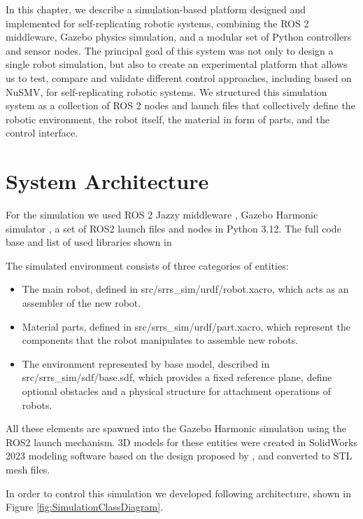 In this chapter, we describe  a simulation-based platform 
designed and implemented for self-replicating robotic systems, 
combining the ROS 2  middleware, Gazebo physics simulation, 
and a modular set of Python controllers and sensor nodes. 
The principal goal of this system was not only to design a single robot simulation, 
but also to create an experimental platform that allows us to test, 
compare and validate different control approaches, including  based  on NuSMV, 
for  self-replicating robotic systems.
We structured this simulation system as a collection of ROS 2 nodes and launch 
files that collectively define the robotic environment, the robot itself, 
the material in form of parts, and the control interface. 


\section{System Architecture}

For the simulation we used ROS 2 Jazzy middleware \cite{ROS2Jazzy},  
Gazebo Harmonic simulator \cite{GazeboHarmonic}, 
a set of ROS2 launch files and nodes in Python 3.12. 
The full code base and list of used libraries shown in \cite{GitHub}

The simulated environment consists of three categories of entities:
\begin{itemize}
    \item The main robot, defined in src/srrs\_sim/urdf/robot.xacro, which acts as an assembler of the new robot.
    \item Material parts, defined in src/srrs\_sim/urdf/part.xacro, which represent the components that 
    the robot manipulates to assemble new robots.
    \item The environment represented by base model, described in src/srrs\_sim/sdf/base.sdf, which provides a 
        fixed reference plane, define optional obstacles and a physical structure for attachment 
        operations of robots.
\end{itemize}

All these elements are spawned into the Gazebo Harmonic simulation using the 
ROS2 launch mechanism.
3D models for these entities were created in SolidWorks 2023 modeling software
based on the design proposed by \cite{Jenett2019MaterialRobot}, 
and converted to STL mesh files.


In order to control this simulation we developed following architecture, 
shown in Figure \ref{fig:SimulationClassDiagram}.

